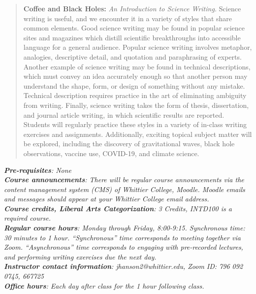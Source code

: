 \documentclass[10pt]{article}
\begin{document}
\maketitle

\begin{abstract}
\textbf{Coffee and Black Holes:} \textit{An Introduction to Science Writing.}  Science writing is useful, and we encounter it in a variety of styles that share common elements. Good science writing may be found in popular science sites and magazines which distill scientific breakthroughs into accessible language for a general audience. Popular science writing involves metaphor, analogies, descriptive detail, and quotation and paraphrasing of experts. Another example of science writing may be found in technical descriptions, which must convey an idea accurately enough so that another person may understand the shape, form, or design of something without any mistake. Technical description requires practice in the art of eliminating ambiguity from writing. Finally, science writing takes the form of thesis, dissertation, and journal article writing, in which scientific results are reported. Students will regularly practice these styles in a variety of in-class writing exercises and assignments.  Additionally, exciting topical subject matter will be explored, including the discovery of gravitational waves, black hole observations, vaccine use, COVID-19, and climate science.
\end{abstract}
\noindent
\textit{\textbf{Pre-requisites}: None} \\
\textit{\textbf{Course announcements}: There will be regular course announcements via the content management system (CMS) of Whittier College, Moodle.  Moodle emails and messages should appear at your Whittier College email address.} \\
\textit{\textbf{Course credits, Liberal Arts Categorization}: 3 Credits, INTD100 is a required course.} \\
\textit{\textbf{Regular course hours}: Monday through Friday, 8:00-9:15.  Synchronous time: 30 minutes to 1 hour.  ``Synchronous'' time corresponds to meeting together via Zoom. ``Asynchronous'' time corresponds to engaging with pre-recorded lectures, and performing writing exercises due the next day.} \\
\textit{\textbf{Instructor contact information}: jhanson2@whittier.edu, Zoom ID: 796 092 0745, 667725} \\
\textit{\textbf{Office hours}: Each day after class for the 1 hour following class.} \\
\end{document}
